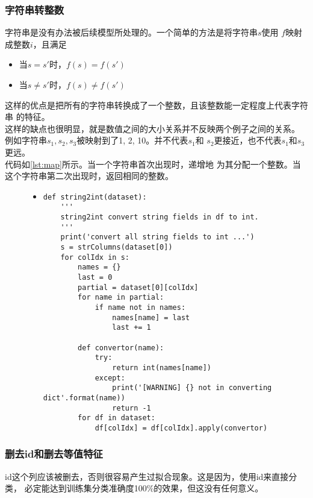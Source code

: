 \documentclass[a4paper]{article}
\begin{document}
\subsubsection{字符串转整数}\label{subsec:toint}
字符串是没有办法被后续模型所处理的。一个简单的方法是将字符串$s$使用
$f$映射成整数$i$，且满足
\begin{itemize}
    \item 当$s = s'$时，$f(s) = f(s')$
    \item 当$s \ne s'$时，$f(s) \ne f(s')$
\end{itemize}
这样的优点是把所有的字符串转换成了一个整数，且该整数能一定程度上代表字符串
的特征。\\

这样的缺点也很明显，就是数值之间的大小关系并不反映两个例子之间的关系。
例如字符串$s_1, s_2, s_3$被映射到了1, 2, 10。并不代表$s_1$和
$s_2$更接近，也不代表$s_1$和$s_3$更远。\\

代码如\autoref{lst:map}所示。当一个字符串首次出现时，递增地
为其分配一个整数。当这个字符串第二次出现时，返回相同的整数。

\begin{figure}[!hbt]
\begin{itemize}
\item[] \begin{lstlisting}[style=mypython, label=lst:map, caption=字符串转整数的代码]
def string2int(dataset):
    '''
    string2int convert string fields in df to int.
    '''
    print('convert all string fields to int ...')
    s = strColumns(dataset[0])
    for colIdx in s:
        names = {}
        last = 0
        partial = dataset[0][colIdx]
        for name in partial:
            if name not in names:
                names[name] = last
                last += 1

        def convertor(name):
            try:
                return int(names[name])
            except:
                print('[WARNING] {} not in converting dict'.format(name))
                return -1
        for df in dataset:
            df[colIdx] = df[colIdx].apply(convertor)
\end{lstlisting}
\end{itemize}
\end{figure}

\subsubsection{删去id和删去等值特征}
id这个列应该被删去，否则很容易产生过拟合现象。这是因为，使用id来直接分类，
必定能达到训练集分类准确度100\%的效果，但这没有任何意义。\\
\end{document}
